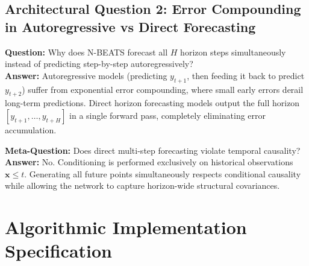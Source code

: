 \documentclass[11pt,a4paper]{article}
\theoremstyle{definition}
\begin{document}
\subsection{Architectural Question 2: Error Compounding in Autoregressive vs Direct Forecasting}
\textbf{Question:} Why does N-BEATS forecast all $H$ horizon steps simultaneously instead of predicting step-by-step autoregressively?\\
\textbf{Answer:} Autoregressive models (predicting $y_{t+1}$, then feeding it back to predict $y_{t+2}$) suffer from exponential error compounding, where small early errors derail long-term predictions. Direct horizon forecasting models output the full horizon $[y_{t+1}, \dots, y_{t+H}]$ in a single forward pass, completely eliminating error accumulation.

\textbf{Meta-Question:} Does direct multi-step forecasting violate temporal causality?\\
\textbf{Answer:} No. Conditioning is performed exclusively on historical observations $\mathbf{x} \le t$. Generating all future points simultaneously respects conditional causality while allowing the network to capture horizon-wide structural covariances.

\section{Algorithmic Implementation Specification}
\end{document}
